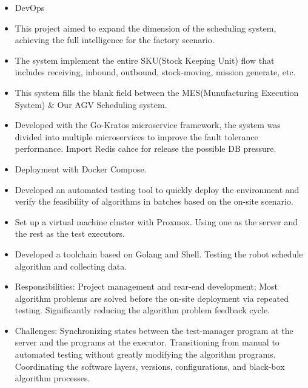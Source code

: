 \documentclass[a4paper,10pt]{resume}
\begin{document}
\begin{itemize}[parsep=0.5ex]
  \item DevOps
  \item This project aimed to expand the dimension of the scheduling system, achieving the full intelligence for the factory scenario.
  \item The system implement the entire SKU(Stock Keeping Unit) flow that includes receiving, inbound, outbound, stock-moving, mission generate, etc.
  \item This system fills the blank field between the MES(Munufacturing Execution System) \& Our AGV Scheduling system.
  \item Developed with the Go-Kratos microservice framework, the system was divided into multiple microservices to improve the fault tolerance performance. Import Redis cahce for release the possible DB pressure.
  \item Deployment with Docker Compose.
\end{itemize}


\begin{itemize}[parsep=0.5ex]
  \item Developed an automated testing tool to quickly deploy the environment and verify the feasibility of algorithms in batches based on the on-site scenario.
  \item Set up a virtual machine cluster with Proxmox. Using one as the server and the rest as the test executors.
  \item Developed a toolchain based on Golang and Shell. Testing the robot schedule algorithm and collecting data.
  \item Responsibilities: Project management and rear-end development; Most algorithm problems are solved before the on-site deployment via repeated testing. Significantly reducing the algorithm problem feedback cycle.
  \item Challenges: Synchronizing states between the test-manager program at the server and the programs at the executor. Transitioning from manual to automated testing without greatly modifying the algorithm programs. Coordinating the software layers, versions, configurations, and black-box algorithm processes.
\end{itemize}
\end{document}
